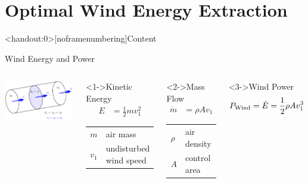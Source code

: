\section[Wind Energy Extraction]{Optimal Wind Energy Extraction}\label{sec:WEN}
\miniframesoff	
\begin{frame}<handout:0>[noframenumbering]{Content}
\tableofcontents[currentsection]
\end{frame}
\miniframeson
\begin{frame}{Wind Energy and Power} 
\setlength{\abovedisplayskip}{0pt}
\setlength{\belowdisplayskip}{0pt}
\begin{columns}
	\column{9cm} 
	\includegraphics[width=\linewidth]{WEN/streamtube1.pdf}		
	\column{5cm}
	\begin{block}<1->{Kinetic Energy}
		\begin{align*}
		E   & = \frac{1}{2} m v_1^2
		\end{align*}
		\begin{tabular}{ll}
			$m$ 	&  air mass\\
			$v_1$ 	&  undisturbed wind speed
		\end{tabular}
	\end{block}	
	\begin{block}<2->{Mass Flow}
		\begin{align*}
		\dot m & = \rho A v_1
		\end{align*}
		\begin{tabular}{ll}
			$\rho $ 	&  air density\\
			$A$ 		&  control area
		\end{tabular}	
	\end{block}	
	\begin{block}<3->{Wind Power}
		\begin{align*}
		P_{\textnormal{Wind}}=\dot E = \frac{1}{2} \rho A v_1^3 
		\end{align*}
	\end{block}	
\end{columns} 	
\end{frame}
